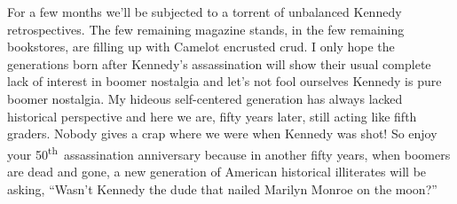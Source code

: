 For a few months we'll be subjected to a torrent of unbalanced Kennedy
retrospectives. The few remaining magazine stands, in the few remaining
bookstores, are filling up with Camelot encrusted crud. I only hope the
generations born after Kennedy's assassination will show their usual
complete lack of interest in boomer nostalgia and let's not fool
ourselves Kennedy is pure boomer nostalgia. My hideous self-centered
generation has always lacked historical perspective and here we are,
fifty years later, still acting like fifth graders. Nobody gives a
crap where we were when Kennedy was shot! So enjoy your
50\textsuperscript{th}~assassination anniversary because in another
fifty years, when boomers are dead and gone, a new generation of
American historical illiterates will be asking, ``Wasn't Kennedy the
dude that nailed Marilyn Monroe on the moon?''

%



%